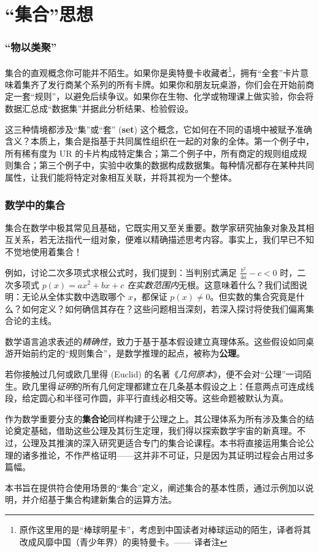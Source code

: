 \section{``集合''思想}

\subsubsection*{``物以类聚''}

集合的直观概念你可能并不陌生。如果你是奥特曼卡收藏者\footnote{原作这里用的是``棒球明星卡''，考虑到中国读者对棒球运动的陌生，译者将其改成风靡中国（青少年界）的奥特曼卡。—— 译者注}，拥有``全套''卡片意味着集齐了发行商某个系列的所有卡牌。如果你和朋友玩桌游，你们会在开始前商定一套``规则''，以避免后续争议。如果你在生物、化学或物理课上做实验，你会将数据汇总成``数据集''并据此分析结果、检验假设。

这三种情境都涉及``集''或``套'' (\textbf{set}) 这个概念，它如何在不同的语境中被赋予准确含义？本质上，集合是指基于共同属性组织在一起的对象的全体。第一个例子中，所有稀有度为 UR 的卡片构成特定集合；第二个例子中，所有商定的规则组成规则集合；第三个例子中，实验中收集的数据构成数据集。每种情况都存在某种共同属性，让我们能将特定对象相互关联，并将其视为一个整体。

\subsubsection*{数学中的集合}

集合在数学中极其常见且基础，它既实用又至关重要。数学家研究抽象对象及其相互关系，若无法指代一组对象，便难以精确描述思考内容。事实上，我们早已不知不觉地使用着集合！

例如，讨论二次多项式求根公式时，我们提到：当判别式满足 $\frac{b^2}{4a} - c < 0$ 时，二次多项式 $p(x) = ax^2 + bx + c$ \emph{在实数范围内}无根。这意味着什么？我们试图说明：无论从全体实数中选取哪个 $x$，都保证 $p(x) \ne 0$。但实数的集合究竟是什么？如何定义？如何确信其存在？这些问题相当深刻，若深入探讨将使我们偏离集合论的主线。

数学语言追求表述的\emph{精确性}，致力于基于基本假设建立真理体系。这些假设如同桌游开始前约定的``规则集合''，是数学推理的起点，被称为\textbf{公理}。

若你接触过几何或欧几里得 (Euclid) 的名著《\emph{几何原本}》，便不会对``公理''一词陌生。欧几里得\emph{证明}的所有几何定理都建立在几条基本假设之上：任意两点可连成线段，给定圆心和半径可作圆，非平行直线必相交等。这些命题被默认为真。

作为数学重要分支的\textbf{集合论}同样构建于公理之上。其公理体系为所有涉及集合的结论奠定基础，借助这些公理及其衍生定理，我们得以探索数学宇宙的新真理。不过，公理及其推演的深入研究更适合专门的集合论课程。本书将直接运用集合论公理的诸多推论，不作严格证明——这并非不可证，只是因为其证明过程会占用过多篇幅。

本书旨在提供符合使用场景的``集合''定义，阐述集合的基本性质，通过示例加以说明，并介绍基于集合构建新集合的运算方法。
